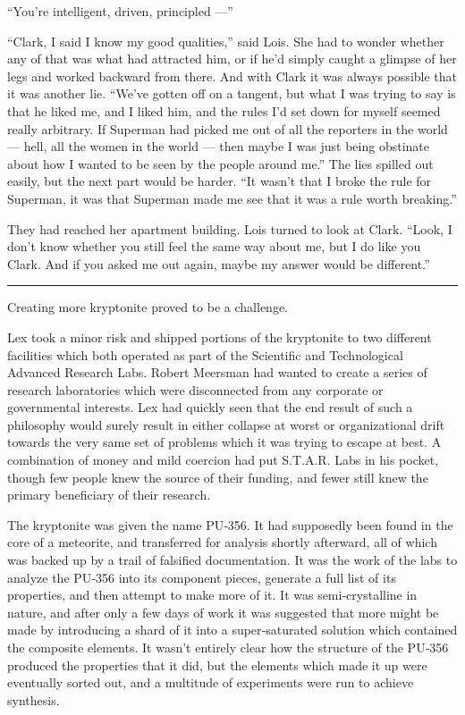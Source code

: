 ``You're intelligent, driven, principled ---''

``Clark, I said I know my good qualities,'' said Lois. She had to wonder
whether any of that was what had attracted him, or if he'd simply caught
a glimpse of her legs and worked backward from there. And with Clark it
was always possible that it was another lie. ``We've gotten off on a
tangent, but what I was trying to say is that he liked me, and I liked
him, and the rules I'd set down for myself seemed really arbitrary. If
Superman had picked me out of all the reporters in the world --- hell,
all the women in the world --- then maybe I was just being obstinate
about how I wanted to be seen by the people around me.'' The lies
spilled out easily, but the next part would be harder. ``It wasn't that
I broke the rule for Superman, it was that Superman made me see that it
was a rule worth breaking.''

They had reached her apartment building. Lois turned to look at Clark.
``Look, I don't know whether you still feel the same way about me, but I
do like you Clark. And if you asked me out again, maybe my answer would
be different.''

\begin{center}\rule{0.5\linewidth}{\linethickness}\end{center}

Creating more kryptonite proved to be a challenge.

Lex took a minor risk and shipped portions of the kryptonite to two
different facilities which both operated as part of the Scientific and
Technological Advanced Research Labs. Robert Meersman had wanted to
create a series of research laboratories which were disconnected from
any corporate or governmental interests. Lex had quickly seen that the
end result of such a philosophy would surely result in either collapse
at worst or organizational drift towards the very same set of problems
which it was trying to escape at best. A combination of money and mild
coercion had put S.T.A.R. Labs in his pocket, though few people knew the
source of their funding, and fewer still knew the primary beneficiary of
their research.

The kryptonite was given the name PU‐356. It had supposedly been found
in the core of a meteorite, and transferred for analysis shortly
afterward, all of which was backed up by a trail of falsified
documentation. It was the work of the labs to analyze the PU‐356 into
its component pieces, generate a full list of its properties, and then
attempt to make more of it. It was semi‐crystalline in nature, and after
only a few days of work it was suggested that more might be made by
introducing a shard of it into a super‐saturated solution which
contained the composite elements. It wasn't entirely clear how the
structure of the PU‐356 produced the properties that it did, but the
elements which made it up were eventually sorted out, and a multitude of
experiments were run to achieve synthesis.

